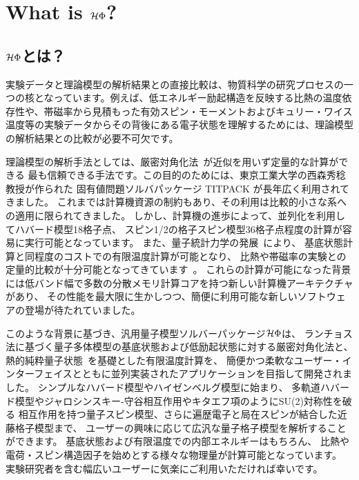 \chapter{What is $\mathcal{H} \Phi$?}
\label{Ch:whatishphi}
\section{$\mathcal{H} \Phi$とは？}
実験データと理論模型の解析結果との直接比較は、物質科学の研究プロセスの一つの核となっています。例えば、低エネルギー励起構造を反映する比熱の温度依存性や、帯磁率から見積もった有効スピン・モーメントおよびキュリー・ワイス温度等の実験データからその背後にある電子状態を理解するためには、理論模型の解析結果との比較が必要不可欠です。

理論模型の解析手法としては、厳密対角化法~\cite{Dagotto}が近似を用いず定量的な計算ができる
最も信頼できる手法です。この目的のためには、東京工業大学の西森秀稔教授が作られた
固有値問題ソルバパッケージ TITPACK が長年広く利用されてきました。
これまでは計算機資源の制約もあり、その利用は比較的小さな系への適用に限られてきました。
しかし、計算機の進歩によって、並列化を利用してハバード模型18格子点、
スピン1/2の格子スピン模型36格子点程度の計算が容易に実行可能となっています。
また、量子統計力学の発展~\cite{Imada1986,FTLanczos,Hams,Sugiura2012}により、
基底状態計算と同程度のコストでの有限温度計算が可能となり、
比熱や帯磁率の実験との定量的比較が十分可能となってきています~\cite{Yamaji2014}。
これらの計算が可能になった背景には低バンド幅で多数の分散メモリ計算コアを持つ新しい計算機アーキテクチャがあり、
その性能を最大限に生かしつつ、簡便に利用可能な新しいソフトウェアの登場が待たれていました。

このような背景に基づき、汎用量子模型ソルバーパッケージ$\mathcal{H} \Phi$は、
ランチョス法に基づく量子多体模型の基底状態および低励起状態に対する厳密対角化法と、
熱的純粋量子状態~\cite{Sugiura2012}を基礎とした有限温度計算を、
簡便かつ柔軟なユーザー・インターフェイスとともに並列実装されたアプリケーションを目指して開発されました。
シンプルなハバード模型やハイゼンベルグ模型に始まり、
多軌道ハバード模型やジャロシンスキー-守谷相互作用やキタエフ項のようにSU(2)対称性を破る
相互作用を持つ量子スピン模型、さらに遍歴電子と局在スピンが結合した近藤格子模型まで、
ユーザーの興味に応じて広汎な量子格子模型を解析することができます。
基底状態および有限温度での内部エネルギーはもちろん、
比熱や電荷・スピン構造因子を始めとする様々な物理量が計算可能となっています。
実験研究者を含む幅広いユーザーに気楽にご利用いただければ幸いです。
